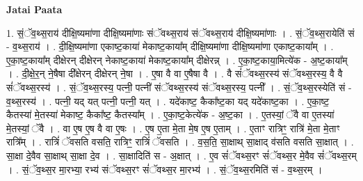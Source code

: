 \documentclass[17pt]{extarticle}
\begin{document}
\textbf{Jatai Paata} \newline

1. सं॒ॅव॒थ्स॒राय॑ दीक्षि॒ष्यमा॑णा दीक्षि॒ष्यमा॑णाः संॅवथ्स॒राय॑ संॅवथ्स॒राय॑ दीक्षि॒ष्यमा॑णाः । . सं॒ॅव॒थ्स॒रायेति॑ सं - व॒थ्स॒राय॑ । . दी॒क्षि॒ष्यमा॑णा एकाष्ट॒काया॑ मेकाष्ट॒काया᳚म् दीक्षि॒ष्यमा॑णा दीक्षि॒ष्यमा॑णा एकाष्ट॒काया᳚म् । . ए॒का॒ष्ट॒काया᳚म् दीक्षेरन् दीक्षेरन् नेकाष्ट॒काया॑ मेकाष्ट॒काया᳚म् दीक्षेरन्न् । . ए॒का॒ष्ट॒काया॒मित्ये॑क - अ॒ष्ट॒काया᳚म् । . दी॒क्षे॒र॒न् ने॒षैषा दी᳚क्षेरन् दीक्षेरन् ने॒षा । . ए॒षा वै वा ए॒षैषा वै । . वै सं॑ॅवथ्स॒रस्य॑ संॅवथ्स॒रस्य॒ वै वै सं॑ॅवथ्स॒रस्य॑ । . सं॒ॅव॒थ्स॒रस्य॒ पत्नी॒ पत्नी॑ संॅवथ्स॒रस्य॑ संॅवथ्स॒रस्य॒ पत्नी᳚ । . सं॒ॅव॒थ्स॒रस्येति॑ सं - व॒थ्स॒रस्य॑ । . पत्नी॒ यद् यत् पत्नी॒ पत्नी॒ यत् । . यदे॑काष्ट॒ कैका᳚ष्ट॒का यद् यदे॑काष्ट॒का । . ए॒का॒ष्ट॒ कैतस्या॑ मे॒तस्या॑ मेकाष्ट॒ कैका᳚ष्ट॒ कैतस्या᳚म् । . ए॒का॒ष्ट॒केत्ये॑क - अ॒ष्ट॒का । . ए॒तस्यां॒ ॅवै वा ए॒तस्या॑ मे॒तस्यां॒ ॅवै । . वा ए॒ष ए॒ष वै वा ए॒षः । . ए॒ष ए॒ता मे॒ता मे॒ष ए॒ष ए॒ताम् । . ए॒ताꣳ रात्रिꣳ॒॒ रात्रि॑ मे॒ता मे॒ताꣳ रात्रि᳚म् । . रात्रिं॑ ॅवसति वसति॒ रात्रिꣳ॒॒ रात्रिं॑ ॅवसति । . व॒स॒ति॒ सा॒क्षाथ् सा॒क्षाद् व॑सति वसति सा॒क्षात् । . सा॒क्षा दे॒वैव सा॒क्षाथ् सा॒क्षा दे॒व । . सा॒क्षादिति॑ स - अ॒क्षात् । . ए॒व सं॑ॅवथ्स॒रꣳ सं॑ॅवथ्स॒र मे॒वैव सं॑ॅवथ्स॒रम् । . सं॒ॅव॒थ्स॒र मा॒रभ्या॒ रभ्य॑ संॅवथ्स॒रꣳ सं॑ॅवथ्स॒र मा॒रभ्य॑ । . सं॒ॅव॒थ्स॒रमिति॑ सं - व॒थ्स॒रम् । \newline
\end{document}
